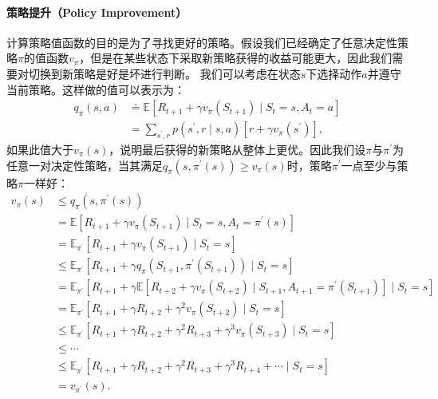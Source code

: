 \paragraph{策略提升（Policy Improvement）}
计算策略值函数的目的是为了寻找更好的策略。假设我们已经确定了任意决定性策略$\pi$的值函数$v_{\pi}$，但是在某些状态下采取新策略获得的收益可能更大，因此我们需要对切换到新策略是好是坏进行判断。
我们可以考虑在状态$s$下选择动作$a$并遵守当前策略。这样做的值可以表示为：
  \begin{align*}
  q_{\pi}(s, a) & \doteq \mathbb{E}\left[R_{t+1}+\gamma v_{\pi}\left(S_{t+1}\right) \mid S_{t}=s, A_{t}=a\right] \\
  &=\sum_{s^{\prime}, r} p\left(s^{\prime}, r \mid s, a\right)\left[r+\gamma v_{\pi}\left(s^{\prime}\right)\right],
  \end{align*}
如果此值大于$v_{\pi}(s)$，说明最后获得的新策略从整体上更优。因此我们设$\pi$与$\pi^{\prime}$为任意一对决定性策略，当其满足$q_{\pi}\left(s, \pi^{\prime}(s)\right) \geq v_{\pi}(s)$时，策略$\pi^{\prime}$一点至少与策略$\pi$一样好：
  \begin{align}
  v_{\pi}(s) & \leq q_{\pi}\left(s, \pi^{\prime}(s)\right) \nonumber\\
  &=\mathbb{E}\left[R_{t+1}+\gamma v_{\pi}\left(S_{t+1}\right) \mid S_{t}=s, A_{t}=\pi^{\prime}(s)\right] \nonumber\\
  &=\mathbb{E}_{\pi^{\prime}}\left[R_{t+1}+\gamma v_{\pi}\left(S_{t+1}\right) \mid S_{t}=s\right] \nonumber\\
  & \leq \mathbb{E}_{\pi^{\prime}}\left[R_{t+1}+\gamma q_{\pi}\left(S_{t+1}, \pi^{\prime}\left(S_{t+1}\right)\right) \mid S_{t}=s\right] \nonumber\\
  &=\mathbb{E}_{\pi^{\prime}}\left[R_{t+1}+\gamma \mathbb{E}\left[R_{t+2}+\gamma v_{\pi}\left(S_{t+2}\right) \mid S_{t+1}, A_{t+1}=\pi^{\prime}\left(S_{t+1}\right)\right] \mid S_{t}=s\right] \nonumber\\
  &=\mathbb{E}_{\pi^{\prime}}\left[R_{t+1}+\gamma R_{t+2}+\gamma^{2} v_{\pi}\left(S_{t+2}\right) \mid S_{t}=s\right] \nonumber\\
  & \leq \mathbb{E}_{\pi^{\prime}}\left[R_{t+1}+\gamma R_{t+2}+\gamma^{2} R_{t+3}+\gamma^{3} v_{\pi}\left(S_{t+3}\right) \mid S_{t}=s\right] \nonumber\\
  & \leq \cdots \nonumber\\
  & \leq \mathbb{E}_{\pi^{\prime}}\left[R_{t+1}+\gamma R_{t+2}+\gamma^{2} R_{t+3}+\gamma^{3} R_{t+4}+\cdots \mid S_{t}=s\right] \nonumber\\
  &=v_{\pi^{\prime}}(s) .
  \label{eq:dddd}
  \end{align}
